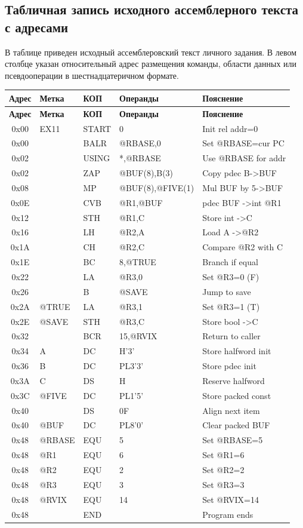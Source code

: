 \documentclass[12pt, a4paper]{article}
\begin{document}
\subsection{Табличная запись исходного ассемблерного текста с адресами}
В таблице приведен исходный ассемблеровский текст личного задания. В левом столбце указан относительный адрес размещения команды, области данных или псевдооперации в шестнадцатеричном формате.

\renewcommand{\arraystretch}{1.2}
\small
\begin{longtable}{|c|l|l|l|l|}
\hline
\textbf{Адрес} & \textbf{Метка} & \textbf{КОП} & \textbf{Операнды} & \textbf{Пояснение} \\
\hline
\endfirsthead
\hline
\textbf{Адрес} & \textbf{Метка} & \textbf{КОП} & \textbf{Операнды} & \textbf{Пояснение} \\
\hline
\endhead
0x00 & EX11 & START & 0 & Init rel addr=0 \\ \hline
0x00 & & BALR & @RBASE,0 & Set @RBASE=cur PC \\ \hline
0x02 & & USING & *,@RBASE & Use @RBASE for addr \\ \hline
0x02 & & ZAP & @BUF(8),B(3) & Copy pdec B->BUF \\ \hline
0x08 & & MP & @BUF(8),@FIVE(1) & Mul BUF by 5->BUF \\ \hline
0x0E & & CVB & @R1,@BUF & pdec BUF ->int @R1 \\ \hline
0x12 & & STH & @R1,C & Store int ->C \\ \hline
0x16 & & LH & @R2,A & Load A ->@R2 \\ \hline
0x1A & & CH & @R2,C & Compare @R2 with C \\ \hline
0x1E & & BC & 8,@TRUE & Branch if equal \\ \hline
0x22 & & LA & @R3,0 & Set @R3=0 (F) \\ \hline
0x26 & & B & @SAVE & Jump to save \\ \hline
0x2A & @TRUE & LA & @R3,1 & Set @R3=1 (T) \\ \hline
0x2E & @SAVE & STH & @R3,C & Store bool ->C \\ \hline
0x32 & & BCR & 15,@RVIX & Return to caller \\ \hline
0x34 & A & DC & H'3' & Store halfword init \\ \hline
0x36 & B & DC & PL3'3' & Store pdec init \\ \hline
0x3A & C & DS & H & Reserve halfword \\ \hline
0x3C & @FIVE & DC & PL1'5' & Store packed const \\ \hline
0x40 & & DS & 0F & Align next item \\ \hline
0x40 & @BUF & DC & PL8'0' & Clear packed BUF \\ \hline
0x48 & @RBASE & EQU & 5 & Set @RBASE=5 \\ \hline
0x48 & @R1 & EQU & 6 & Set @R1=6 \\ \hline
0x48 & @R2 & EQU & 2 & Set @R2=2 \\ \hline
0x48 & @R3 & EQU & 3 & Set @R3=3 \\ \hline
0x48 & @RVIX & EQU & 14 & Set @RVIX=14 \\ \hline
0x48 & & END & & Program ends \\ \hline
\end{longtable}
\end{document}
